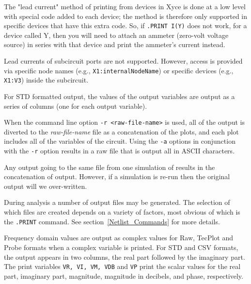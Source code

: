 \begin{Command}
\begin{XyceItemize}
\item The "lead current" method of printing from devices in Xyce is done
  at a low level with special code added to each device; the method is
  therefore only supported in specific devices that have this extra
  code.  So, if \texttt{.PRINT I(Y)} does not work, for a device called
  Y, then you will need to attach an ammeter (zero-volt voltage source)
  in series with that device and print the ammeter's current instead.

\item Lead currents of subcircuit ports are not supported.  However,
  access is provided via specific node names (e.g.,
  \texttt{X1:internalNodeName}) or specific devices (e.g.,
  \texttt{X1:V3}) inside the subcircuit.

\item For STD formatted output, the values of the output variables are
  output as a series of columns (one for each output variable).

\item When the command line option \texttt{-r <raw-file-name>} is used,
  all of the output is diverted to the \emph{raw-file-name} file as a
  concatenation of the plots, and each plot includes all of the
  variables of the circuit.  Using the \texttt{-a} options in
  conjunction with the \texttt{-r} option results in a raw file that is
  output all in ASCII characters.

\item Any output going to the same file from one simulation of \Xyce{}
  results in the concatenation of output.  However, if a simulation is
  re-run then the original output will we over-written.

\item During analysis a number of output files may be generated.  The
  selection of which files are created depends on a variety of factors,
  most obvious of which is the \texttt{.PRINT} command. See
  section~\ref{Netlist_Commands} for more details.

\item Frequency domain values are output as complex values for Raw,
  TecPlot and Probe formats when a complex variable is printed.  For STD
  and CSV formats, the output appears in two columns, the real part
  followed by the imaginary part.  The print variables 
  \texttt{VR, VI, VM, VDB} and \texttt{VP} print the scalar values 
  for the real part, imaginary part,
  magnitude, magnitude in decibels, and phase, respectively.


\end{XyceItemize}
\end{Command}

